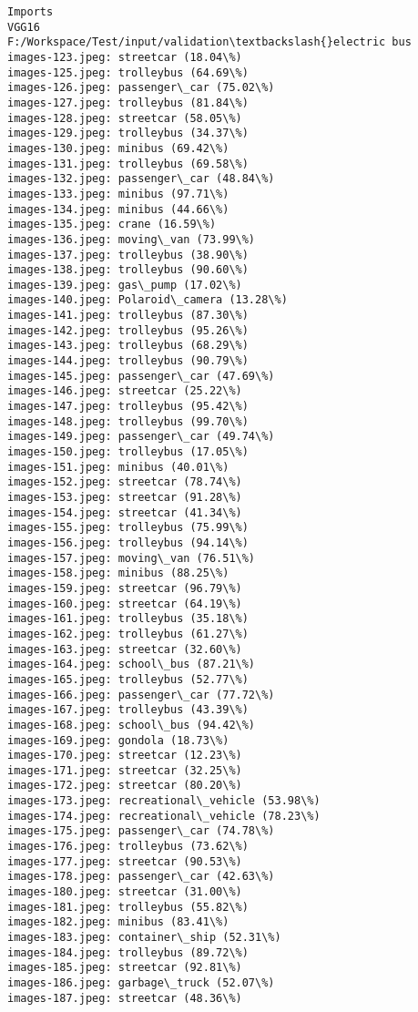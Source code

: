 \documentclass[11pt]{article}
\begin{document}
    \begin{Verbatim}[commandchars=\\\{\}]
Imports
VGG16
F:/Workspace/Test/input/validation\textbackslash{}electric bus
images-123.jpeg: streetcar (18.04\%)
images-125.jpeg: trolleybus (64.69\%)
images-126.jpeg: passenger\_car (75.02\%)
images-127.jpeg: trolleybus (81.84\%)
images-128.jpeg: streetcar (58.05\%)
images-129.jpeg: trolleybus (34.37\%)
images-130.jpeg: minibus (69.42\%)
images-131.jpeg: trolleybus (69.58\%)
images-132.jpeg: passenger\_car (48.84\%)
images-133.jpeg: minibus (97.71\%)
images-134.jpeg: minibus (44.66\%)
images-135.jpeg: crane (16.59\%)
images-136.jpeg: moving\_van (73.99\%)
images-137.jpeg: trolleybus (38.90\%)
images-138.jpeg: trolleybus (90.60\%)
images-139.jpeg: gas\_pump (17.02\%)
images-140.jpeg: Polaroid\_camera (13.28\%)
images-141.jpeg: trolleybus (87.30\%)
images-142.jpeg: trolleybus (95.26\%)
images-143.jpeg: trolleybus (68.29\%)
images-144.jpeg: trolleybus (90.79\%)
images-145.jpeg: passenger\_car (47.69\%)
images-146.jpeg: streetcar (25.22\%)
images-147.jpeg: trolleybus (95.42\%)
images-148.jpeg: trolleybus (99.70\%)
images-149.jpeg: passenger\_car (49.74\%)
images-150.jpeg: trolleybus (17.05\%)
images-151.jpeg: minibus (40.01\%)
images-152.jpeg: streetcar (78.74\%)
images-153.jpeg: streetcar (91.28\%)
images-154.jpeg: streetcar (41.34\%)
images-155.jpeg: trolleybus (75.99\%)
images-156.jpeg: trolleybus (94.14\%)
images-157.jpeg: moving\_van (76.51\%)
images-158.jpeg: minibus (88.25\%)
images-159.jpeg: streetcar (96.79\%)
images-160.jpeg: streetcar (64.19\%)
images-161.jpeg: trolleybus (35.18\%)
images-162.jpeg: trolleybus (61.27\%)
images-163.jpeg: streetcar (32.60\%)
images-164.jpeg: school\_bus (87.21\%)
images-165.jpeg: trolleybus (52.77\%)
images-166.jpeg: passenger\_car (77.72\%)
images-167.jpeg: trolleybus (43.39\%)
images-168.jpeg: school\_bus (94.42\%)
images-169.jpeg: gondola (18.73\%)
images-170.jpeg: streetcar (12.23\%)
images-171.jpeg: streetcar (32.25\%)
images-172.jpeg: streetcar (80.20\%)
images-173.jpeg: recreational\_vehicle (53.98\%)
images-174.jpeg: recreational\_vehicle (78.23\%)
images-175.jpeg: passenger\_car (74.78\%)
images-176.jpeg: trolleybus (73.62\%)
images-177.jpeg: streetcar (90.53\%)
images-178.jpeg: passenger\_car (42.63\%)
images-180.jpeg: streetcar (31.00\%)
images-181.jpeg: trolleybus (55.82\%)
images-182.jpeg: minibus (83.41\%)
images-183.jpeg: container\_ship (52.31\%)
images-184.jpeg: trolleybus (89.72\%)
images-185.jpeg: streetcar (92.81\%)
images-186.jpeg: garbage\_truck (52.07\%)
images-187.jpeg: streetcar (48.36\%)

\end{Verbatim}
\end{document}

